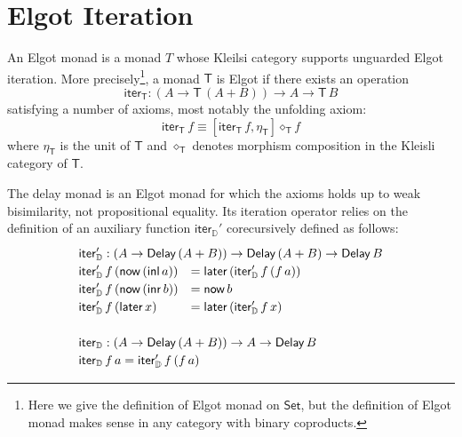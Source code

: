 \documentclass[runningheads]{llncs}
\newcommand{\Set}{\mathsf{Set}}
\newcommand{\copair}[2]{[#1,#2]}
\newcommand{\inl}{\mathsf{inl}}
\newcommand{\inr}{\mathsf{inr}}
\newcommand{\T}{\mathsf{T}}
\newcommand{\iter}{\mathsf{iter}}
\newcommand{\Delay}{\mathsf{Delay}\,}
\newcommand{\now}{\mathsf{now}}
\newcommand{\later}{\mathsf{later}}
\newcommand{\D}{\mathbb{D}}
\newcommand{\iterD}{\mathsf{iter}_\D}
\begin{document}
\section{Elgot Iteration}\label{sec:elgot}

An Elgot monad is a monad $T$ whose Kleilsi category supports
unguarded Elgot iteration. More precisely\footnote{Here we give the
  definition of Elgot monad on $\Set$, but the definition of Elgot
  monad makes sense in any category with binary coproducts.}, a monad
$\T$ is Elgot if there exists an operation
\[
\iter_\T : (A \to \T \,(A + B)) \to A \to \T\,B
\]
satisfying a number of axioms, most notably the unfolding axiom:
\[
\iter_\T\,f \equiv \copair{\iter_\T \,f}{\eta_\T} \diamond_\T f
\]
where $\eta_\T$ is the unit of $\T$ and $\diamond_\T$ denotes morphism
composition in the Kleisli category of $\T$.

The delay monad is an Elgot monad for which the axioms holds up to
weak bisimilarity, not propositional equality. Its iteration operator
relies on the definition of an auxiliary function $\iterD'$
corecursively defined as follows:
\[ %
\def\arraystretch{1.2}
\begin{array}{ll}
\multicolumn{2}{l}{\iterD' : (A \to \Delay (A + B)) \to \Delay (A + B) \to \Delay B} \\
\iterD' \,f \,(\now \,(\inl\, a)) &= \later \,(\iterD' \,f \,(f \,a)) \\
\iterD' \,f \,(\now \,(\inr\, b)) &= \now \,b \\
\iterD' \,f \,(\later \,x) &= \later \,(\iterD' \,f \,x) \\
 \\
\multicolumn{2}{l}{\iterD : (A \to \Delay (A + B)) \to A \to \Delay B} \\
\multicolumn{2}{l}{\iterD \,f \,a = \iterD' \,f \,(f \,a)}
\end{array}
\]
\end{document}
